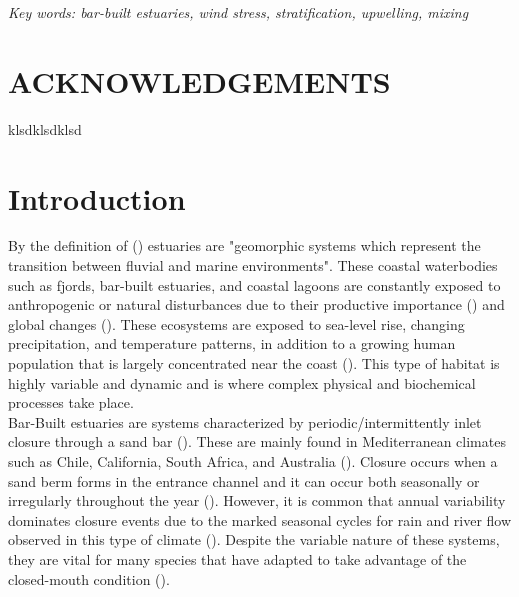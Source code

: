 \documentclass[11pt,letterpaper]{article}
\begin{document}
    \textit{Key words: bar-built estuaries, wind stress, stratification, upwelling, mixing}

    \newpage
    \section*{ACKNOWLEDGEMENTS}
    
    klsdklsdklsd
    \newpage
    
    \tableofcontents
    
    \listoffigures
    
    \listoftables
    
    \newpage
    
    \section{Introduction}
    
    
    By the definition of \citeauthor{mcsweeney2017intermittently} (\cite*{mcsweeney2017intermittently}) estuaries are "geomorphic systems which represent the transition between fluvial and marine environments". These coastal waterbodies such as fjords, bar-built estuaries, and coastal lagoons are constantly exposed to anthropogenic or natural disturbances due to their productive importance (\cite{schernewski2002baltic, martinez2007coasts}) and global changes (\cite{grez2020evidence}). These ecosystems are exposed to sea-level rise, changing precipitation, and temperature patterns, in addition to a growing human population that is largely concentrated near the coast (\cite{neumann2015future}). This type of habitat is highly variable and dynamic and is where complex physical and biochemical processes take place.\\
    
    Bar-Built estuaries are systems characterized by periodic/intermittently inlet closure through a sand bar (\cite{whitfield2007review}). These are mainly found in Mediterranean climates such as Chile, California, South Africa, and Australia (\cite{mcsweeney2017intermittently}). Closure occurs when a sand berm forms in the entrance channel and it can occur both seasonally or irregularly throughout the year (\cite{Behrens2013}). However, it is common that annual variability dominates closure events due to the marked seasonal cycles for rain and river flow observed in this type of climate (\cite{Ranasinghe2003}). Despite the variable nature of these systems, they are vital for many species that have adapted to take advantage of the closed-mouth condition (\cite{viaroli2008community}).\\
    
\end{document}
